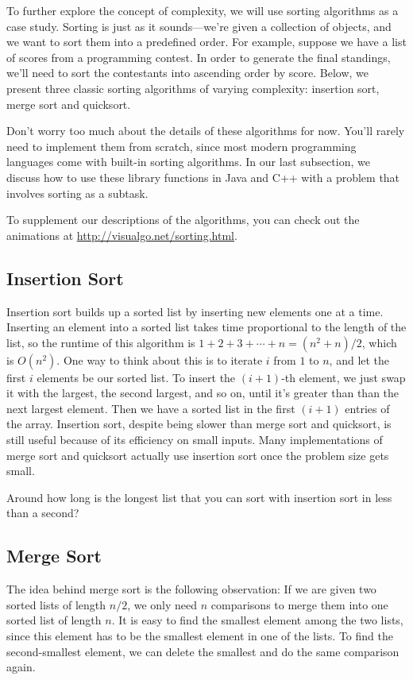 To further explore the concept of complexity, we will use sorting algorithms as a case study. Sorting is just as it sounds---we're given a collection of objects, and we want to sort them into a predefined order. For example, suppose we have a list of scores from a programming contest. In order to generate the final standings, we'll need to sort the contestants into ascending order by score. Below, we present three classic sorting algorithms of varying complexity: insertion sort, merge sort and quicksort.

Don't worry too much about the details of these algorithms for now. You'll rarely need to implement them from scratch, since most modern programming languages come with built-in sorting algorithms. In our last subsection, we discuss how to use these library functions in Java and C++ with a problem that involves sorting as a subtask.

To supplement our descriptions of the algorithms, you can check out the animations at \url{http://visualgo.net/sorting.html}.

\subsection{Insertion Sort}

Insertion sort builds up a sorted list by inserting new elements one at a time. Inserting an element into a sorted list takes time proportional to the length of the list, so the runtime of this algorithm is $1 + 2 + 3 + \cdots + n = (n^2 + n) / 2$, which is $O(n^2)$. One way to think about this is to iterate $i$ from $1$ to $n$, and let the first $i$ elements be our sorted list. To insert the $(i+1)$-th element, we just swap it with the largest, the second largest, and so on, until it's greater than than the next largest element. Then we have a sorted list in the first $(i+1)$ entries of the array. Insertion sort, despite being slower than merge sort and quicksort, is still useful because of its efficiency on small inputs. Many implementations of merge sort and quicksort actually use insertion sort once the problem size gets small.

Around how long is the longest list that you can sort with insertion sort in less than a second?

\subsection{Merge Sort}

The idea behind merge sort is the following observation: If we are given two sorted lists of length $n/2$, we only need $n$ comparisons to merge them into one sorted list of length $n$. It is easy to find the smallest element among the two lists, since this element has to be the smallest element in one of the lists. To find the second-smallest element, we can delete the smallest and do the same comparison again.

